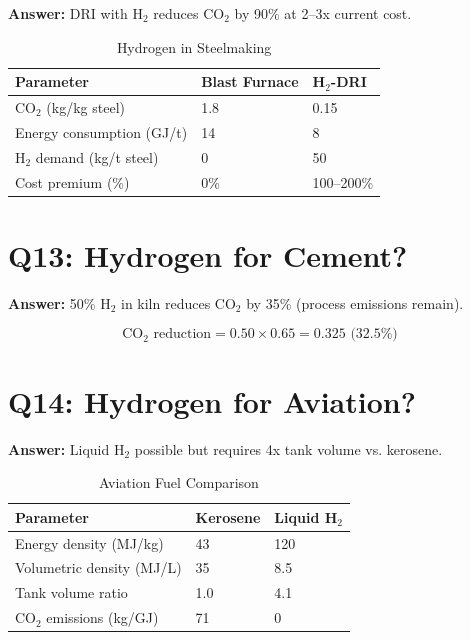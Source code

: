 \documentclass[12pt,twoside,openany]{book}
\begin{document}
\textbf{Answer:} DRI with H$_2$ reduces CO$_2$ by 90\% at 2--3x current cost.

\begin{table}[htbp]
    \centering
    \caption{Hydrogen in Steelmaking}
    \label{tab:steel}
    \begin{tabular}{L{4cm} C{2.5cm} C{2.5cm}}
    \hline
    \textbf{Parameter} & \textbf{Blast Furnace} & \textbf{H$_2$-DRI} \\
    \hline
    CO$_2$ (kg/kg steel) & 1.8 & 0.15 \\
    Energy consumption (GJ/t) & 14 & 8 \\
    H$_2$ demand (kg/t steel) & 0 & 50 \\
    Cost premium (\%) & 0\% & 100--200\% \\
    \hline
    \end{tabular}
\end{table}

\section{Q13: Hydrogen for Cement?}

\textbf{Answer:} 50\% H$_2$ in kiln reduces CO$_2$ by 35\% (process emissions remain).

\begin{dmath}
\text{CO}_2 \text{ reduction} = 0.50 \times 0.65 = 0.325 \text{ (32.5\%)}
\end{dmath}

\section{Q14: Hydrogen for Aviation?}

\textbf{Answer:} Liquid H$_2$ possible but requires 4x tank volume vs. kerosene.

\begin{table}[htbp]
    \centering
    \caption{Aviation Fuel Comparison}
    \label{tab:aviation}
    \begin{tabular}{L{4cm} C{2.5cm} C{2.5cm}}
    \hline
    \textbf{Parameter} & \textbf{Kerosene} & \textbf{Liquid H$_2$} \\
    \hline
    Energy density (MJ/kg) & 43 & 120 \\
    Volumetric density (MJ/L) & 35 & 8.5 \\
    Tank volume ratio & 1.0 & 4.1 \\
    CO$_2$ emissions (kg/GJ) & 71 & 0 \\
    \hline
    \end{tabular}
\end{table}
\end{document}
